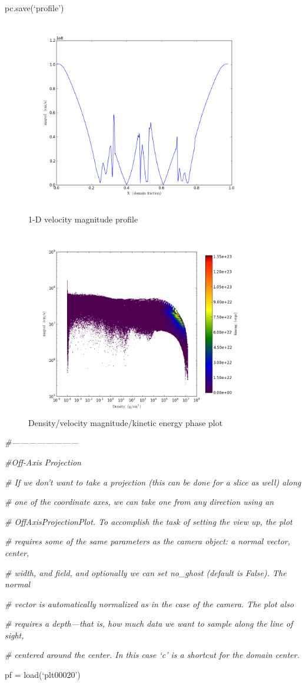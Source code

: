 pc.save(`profile')
\begin{figure}[h]
  \centering
  \includegraphics[width=4.0in]{LineQueryPlot_0_t_magvel}
  \caption{1-D velocity magnitude profile}
  \includegraphics[width=4.0in]{Profile2D_1_Density_magvel_kineng}
  \caption{Density/velocity magnitude/kinetic energy phase plot}
\end{figure}
\quad

{\it\#------------------------}

{\it\#Off-Axis Projection}
{\setlength{\parskip}{0pt}

{\it\# If we don't want to take a projection (this can be done for a slice as well) along}

{\it\# one of the coordinate axes, we can take one from any direction using an}

{\it\# OffAxisProjectionPlot. To accomplish the task of setting the view up, the plot}

{\it\# requires some of the same parameters as the camera object: a normal vector, center,}

{\it\# width, and field, and optionally we can set no\_ghost (default is False). The normal}

{\it\# vector is automatically normalized as in the case of the camera. The plot also}

{\it\# requires a depth---that is, how much data we want to sample along the line of sight,}

{\it\# centered around the center. In this case `c' is a shortcut for the domain center.}

pf = load(`plt00020')
}

